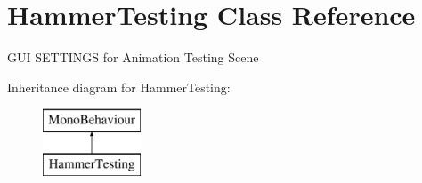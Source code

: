 \hypertarget{class_hammer_testing}{}\section{Hammer\+Testing Class Reference}
\label{class_hammer_testing}


G\+UI S\+E\+T\+T\+I\+N\+GS for Animation Testing Scene  


Inheritance diagram for Hammer\+Testing\+:\begin{figure}[H]
\begin{center}
\leavevmode
\includegraphics[height=2.000000cm]{class_hammer_testing}
\end{center}
\end{figure}
